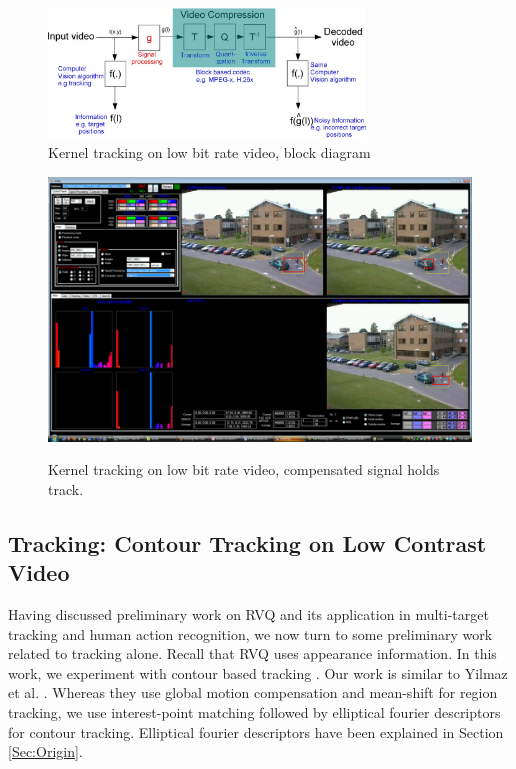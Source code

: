 \documentclass[12pt,letterpaper,doublespaced,ETD,proposal]{gt-ece-thesis}
\begin{document}
\begin{Body}
					\begin{figure}
					\centering
					\includegraphics[width=0.75\textwidth]{figs/Proposal_fig9_TRK_lowBitrate_blockDiagram}
					\caption{Kernel tracking on low bit rate video, block diagram}
					\label{fig:SolutionThroughSigProc2}
					\end{figure}



						\begin{figure}
						\includegraphics[width=1.0\textwidth]{figs/Proposal_fig10_TRK_lowBitrate_PETS2001_FN_592}
						\label{fig:KernelTracking_picture}
						\caption{Kernel tracking on low bit rate video, compensated signal holds track.}
						\end{figure}

			
\subsection{Tracking: Contour Tracking on Low Contrast Video}
Having discussed preliminary work on RVQ and its application in multi-target tracking and human action recognition, we now turn to some preliminary work related to tracking alone.  Recall that RVQ uses appearance information.  In this work, we experiment with contour based tracking \cite{2010_CNF_VehicleContour_Aslam}.  Our work is similar to Yilmaz et al. \cite{2003_JNL_AirborneIRtracking_Yilmaz}.  Whereas they use global motion compensation and mean-shift for region tracking, we use interest-point matching followed by elliptical fourier descriptors for contour tracking.  Elliptical fourier descriptors have been explained in Section \ref{Sec:Origin}.


\end{Body}
\end{document}
